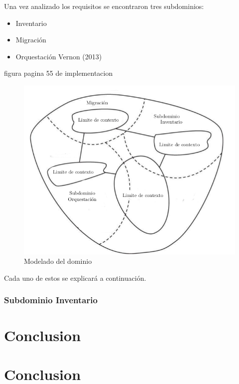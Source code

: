 \documentclass[12pt,twoside]{reedthesis}
\providecommand{\tightlist}{%
  \setlength{\itemsep}{0pt}\setlength{\parskip}{0pt}}
\begin{document}
Una vez analizado los requisitos se encontraron tres subdominios:
\begin{itemize}
\tightlist
\item
  Inventario
\item
  Migración
\item
  Orquestación Vernon (2013)
\end{itemize}
figura pagina 55 de implementacion
\begin{figure}[h!]
  \centering
  \includegraphics[scale=0.5]{./figure/Cap4/plantillaDDD.png}
  \caption{Modelado del dominio}\label{DDDplantilla}
\end{figure}
Cada uno de estos se explicará a continuación.

\hypertarget{subdominio-inventario}{%
\subsection{Subdominio Inventario}\label{subdominio-inventario}}

\hypertarget{conclusion}{%
\chapter*{Conclusion}\label{conclusion}}

\hypertarget{conclusion-1}{%
\chapter*{Conclusion}\label{conclusion-1}}
\end{document}
